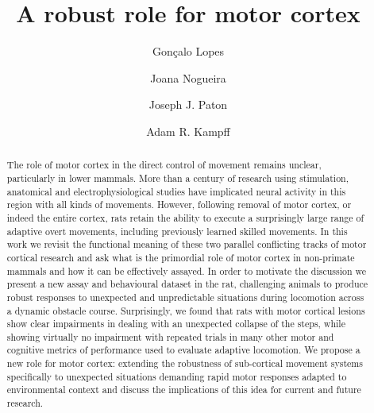 \documentclass[12pt]{article}
\title{A robust role for motor cortex}
\author{Gonçalo Lopes}
\author{Joana Nogueira}
\author{Joseph J. Paton}
\author{Adam R. Kampff}
\affil{Champalimaud Neuroscience Programme\\ Champalimaud Centre for the Unknown, Lisbon, Portugal}
\newcounter{video}
\begin{document}
\maketitle

\begin{linenumbers}
\begin{abstract}
The role of motor cortex in the direct control of movement remains unclear, particularly in lower mammals. More than a century of research using stimulation, anatomical and electrophysiological studies have implicated neural activity in this region with all kinds of movements. However, following removal of motor cortex, or indeed the entire cortex, rats retain the ability to execute a surprisingly large range of adaptive overt movements, including previously learned skilled movements. In this work we revisit the functional meaning of these two parallel conflicting tracks of motor cortical research and ask what is the primordial role of motor cortex in non-primate mammals and how it can be effectively assayed. In order to motivate the discussion we present a new assay and behavioural dataset in the rat, challenging animals to produce robust responses to unexpected and unpredictable situations during locomotion across a dynamic obstacle course. Surprisingly, we found that rats with motor cortical lesions show clear impairments in dealing with an unexpected collapse of the steps, while showing virtually no impairment with repeated trials in many other motor and cognitive metrics of performance used to evaluate adaptive locomotion. We propose a new role for motor cortex: extending the robustness of sub-cortical movement systems specifically to unexpected situations demanding rapid motor responses adapted to environmental context and discuss the implications of this idea for current and future research.
\end{abstract}








\end{linenumbers}
\printbibliography
\end{document}
